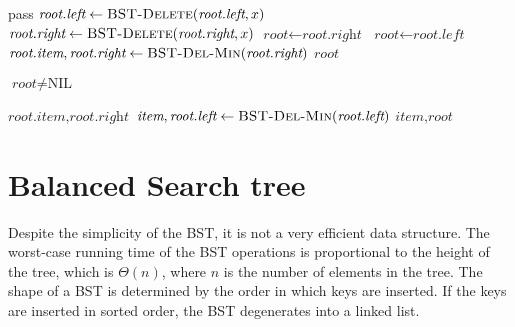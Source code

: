 \begin{algorithm}[H] \begin{algorithmic}[1]
        \State {}
            pass 
            \State $\textit{root.left} \gets \textsc{BST-Delete}(\textit{root.left}, x)$
            \State $\textit{root.right} \gets \textsc{BST-Delete}(\textit{root.right}, x)$
        \Else {~} 
                \State $\textit{root} \gets \textit{root.right}$ 
                \State $\textit{root} \gets \textit{root.left}$
            \Else {~} 
                \State $\textit{root.item}, \textit{root.right} \gets \textsc{BST-Del-Min}(\textit{root.right})$
            \EndIf
        \EndIf
        \State \Return $\textit{root}$
    \EndProcedure
\end{algorithmic} \end{algorithm}

\begin{algorithm}[H] \begin{algorithmic}[1]
        \State {}
        \Require $\textit{root} \neq \text{NIL}$

            \State \Return $\textit{root.item}, \textit{root.right}$
        \Else 
            \State $\textit{item}, \textit{root.left} \gets \textsc{BST-Del-Min}(\textit{root.left})$
            \State \Return $\textit{item}, \textit{root}$
        \EndIf
    \EndProcedure
\end{algorithmic} \end{algorithm}

\section{Balanced Search tree}

Despite the simplicity of the BST, it is not a very efficient data structure. The worst-case running time of the BST operations is proportional to the height of the tree, which is $\Theta(n)$, where $n$ is the number of elements in the tree. The shape of a BST is determined by the order in which keys are inserted. If the keys are inserted in sorted order, the BST degenerates into a linked list. 

